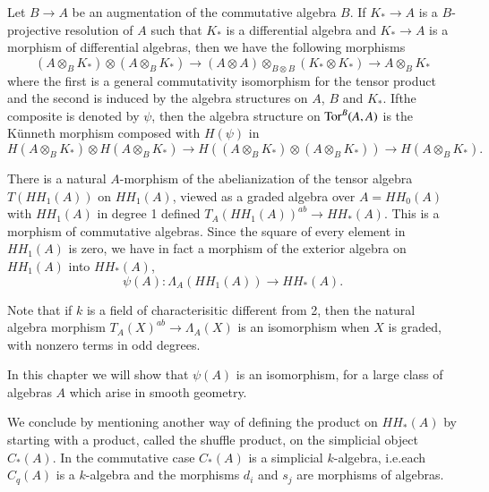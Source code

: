 \begin{remark}\label{chap6-rem2.7}
Let $B\to A$ be an augmentation of the commutative algebra $B$. If
$K_{\ast}\to A$ is a $B$-projective resolution of $A$ such that
$K_{\ast}$ is a differential algebra and $K_{\ast}\to A$ is a morphism
of differential algebras, then we have the following morphisms
$$
(A\otimes_{B}K_{\ast})\otimes (A\otimes_{B}K_{\ast})\to (A\otimes
A)\otimes_{B\otimes B}(K_{\ast}\otimes K_{\ast})\to
A\otimes_{B}K_{\ast}
$$
where the first is a general commutativity isomorphism for the tensor
product and the second is induced by the algebra structures on $A$,
$B$ and $K_{\ast}$. If\pageoriginale the composite is denoted by
$\psi$, then the algebra structure on $\operatorname{Tor}^{B}(A,A)$ is the K\"unneth
morphism composed with $H(\psi)$ in
$$
H(A\otimes_BK_{\ast})\otimes H(A\otimes_{B}K_{\ast})\to
H((A\otimes_{B}K_{\ast})\otimes (A\otimes_{B}K_{\ast}))\to
H(A\otimes_{B}K_{\ast}). 
$$
\end{remark}

\begin{remark}\label{chap6-rem2.8}
There is a natural $A$-morphism of the abelianization of the tensor
algebra $T(HH_{1}(A))$ on $HH_{1}(A)$, viewed as a graded algebra over
$A=HH_{0}(A)$ with $HH_{1}(A)$ in degree 1 defined
$T_{A}(HH_{1}(A))^{ab}\to HH_{\ast}(A)$. This is a morphism of
commutative algebras. Since the square of every element in $HH_{1}(A)$
is zero, we have in fact a morphism of the exterior algebra on
$HH_{1}(A)$ into $HH_{\ast}(A)$, 
$$
\psi(A):\Lambda_{A}(HH_{1}(A))\to HH_{\ast}(A).
$$

Note that if $k$ is a field of characterisitic different from 2, then
the natural algebra morphism $T_{A}(X)^{ab}\to \Lambda_{A}(X)$ is an
isomorphism when $X$ is graded, with nonzero terms in odd degrees.
\end{remark}

In this chapter we will show that $\psi(A)$ is an isomorphism, for a
large class of algebras $A$ which arise in smooth geometry.

We conclude by mentioning another way of defining the product on
$HH_{\ast}(A)$ by starting with a product, called the shuffle
product,
on the simplicial object $C_{\ast}(A)$. In the commutative case
$C_{\ast}(A)$ is a simplicial $k$-algebra, i.e.\@ each $C_{q}(A)$ is a
$k$-algebra and the morphisms $d_{i}$ and $s_{j}$ are morphisms of
algebras. 


